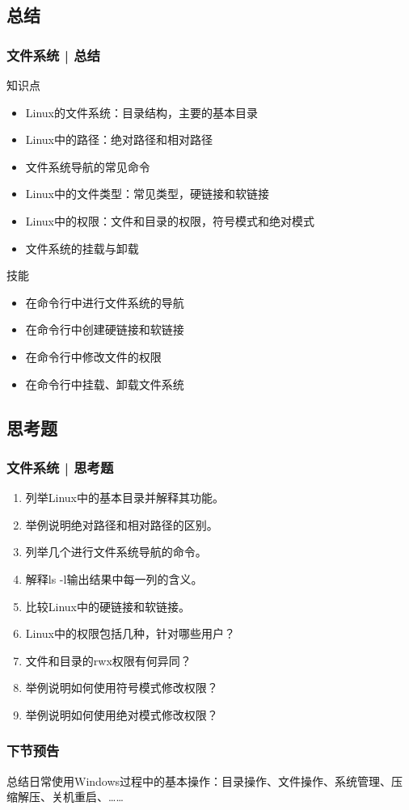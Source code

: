 \subsection{总结}
\begin{frame}
  \frametitle{文件系统 | 总结}
  \begin{block}{知识点}
    \begin{itemize}
      \item Linux的文件系统：目录结构，主要的基本目录
      \item Linux中的路径：绝对路径和相对路径
      \item 文件系统导航的常见命令
      \item Linux中的文件类型：常见类型，硬链接和软链接
      \item Linux中的权限：文件和目录的权限，符号模式和绝对模式
      \item 文件系统的挂载与卸载
    \end{itemize}
  \end{block}
  \begin{block}{技能}
    \begin{itemize}
      \item 在命令行中进行文件系统的导航
      \item 在命令行中创建硬链接和软链接
      \item 在命令行中修改文件的权限
      \item 在命令行中挂载、卸载文件系统
    \end{itemize}
  \end{block}
\end{frame}

\subsection{思考题}
\begin{frame}
  \frametitle{文件系统 | 思考题}
  \begin{enumerate}
    \item 列举Linux中的基本目录并解释其功能。
    \item 举例说明绝对路径和相对路径的区别。
    \item 列举几个进行文件系统导航的命令。
    \item 解释ls -l输出结果中每一列的含义。
    \item 比较Linux中的硬链接和软链接。
    \item Linux中的权限包括几种，针对哪些用户？
    \item 文件和目录的rwx权限有何异同？
    \item 举例说明如何使用符号模式修改权限？
    \item 举例说明如何使用绝对模式修改权限？
  \end{enumerate}
\end{frame}

\begin{frame}
  \frametitle{下节预告}
  总结日常使用Windows过程中的基本操作：目录操作、文件操作、系统管理、压缩解压、关机重启、……
\end{frame}



